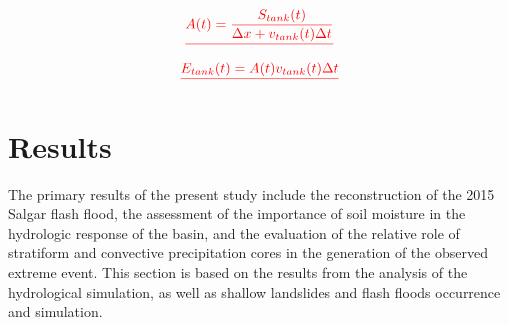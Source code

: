 \documentclass[hess, manuscript]{copernicus} %
\providecommand{\DIFadd}[1]{{\protect\color{blue}\uwave{#1}}} %
\providecommand{\DIFdel}[1]{{\protect\color{red}\sout{#1}}}                      %
\providecommand{\DIFaddbegin}{} %
\providecommand{\DIFaddend}{} %
\providecommand{\DIFdelend}{} %
\begin{document}
\begin{displaymath}
 \DIFdel{A(t) = \frac{S_{tank}(t)}{\Delta x + v_{tank}(t) \Delta t}
}\end{displaymath}
\begin{displaymath}
    \DIFdel{E_{tank}(t) =  A(t) v_{tank}(t) \Delta t
}\end{displaymath}
\DIFdelend \DIFaddbegin \DIFadd{elevation.
}\DIFaddend 

\section{Results}
\label{sec:results}

The primary results of the present study include the reconstruction of the 2015 Salgar flash flood, the assessment of the importance of soil moisture in the hydrologic response of the basin, and the evaluation of the relative role of stratiform and convective precipitation cores in the generation of the observed extreme event. This section is based on the results from the analysis of the hydrological simulation, as well as shallow landslides and flash floods occurrence and simulation. \\
\end{document}
